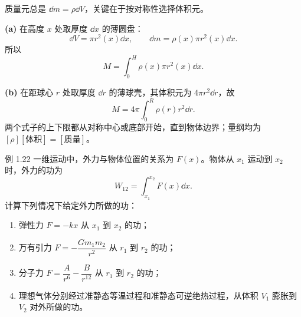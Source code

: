 \begin{xesolution}
质量元总是 $\dd m=\rho\dd V$，关键在于按对称性选择体积元。

\textbf{(a)} 在高度 $x$ 处取厚度 $\dd x$ 的薄圆盘：
\[
 \dd V=\pi r^2(x)\dd x,
 \qquad
 \dd m=\rho(x)\pi r^2(x)\dd x.
\]
所以
\[
 \boxed{M=\int_0^H\rho(x)\pi r^2(x)\dd x}.
\]

\textbf{(b)} 在距球心 $r$ 处取厚度 $\dd r$ 的薄球壳，其体积元为
$4\pi r^2\dd r$，故
\[
 \boxed{M=4\pi\int_0^R\rho(r)r^2\dd r}.
\]
\massElementsDiagram
两个式子的上下限都从对称中心或底部开始，直到物体边界；量纲均为
$[\rho][\text{体积}]=[\text{质量}]$。
\end{xesolution}

\Needspace{0.38\textheight}
\begin{origexamplebox}{例 1.22}
一维运动中，外力与物体位置的关系为 $F(x)$。物体从 $x_1$ 运动到 $x_2$ 时，外力的功为
\[
 W_{12}=\int_{x_1}^{x_2}F(x)\dd x.
\]
计算下列情况下给定外力所做的功：
\begin{enumerate}[label=(\alph*),leftmargin=2.2em]
 \item 弹性力 $F=-kx$ 从 $x_1$ 到 $x_2$ 的功；
 \item 万有引力 $F=-\dfrac{Gm_1m_2}{r^2}$ 从 $r_1$ 到 $r_2$ 的功；
 \item 分子力 $F=\dfrac{A}{r^6}-\dfrac{B}{r^{12}}$ 从 $r_1$ 到 $r_2$ 的功；
 \item 理想气体分别经过准静态等温过程和准静态可逆绝热过程，从体积 $V_1$ 膨胀到 $V_2$ 对外所做的功。
\end{enumerate}
\pvWorkDiagram
\end{origexamplebox}

